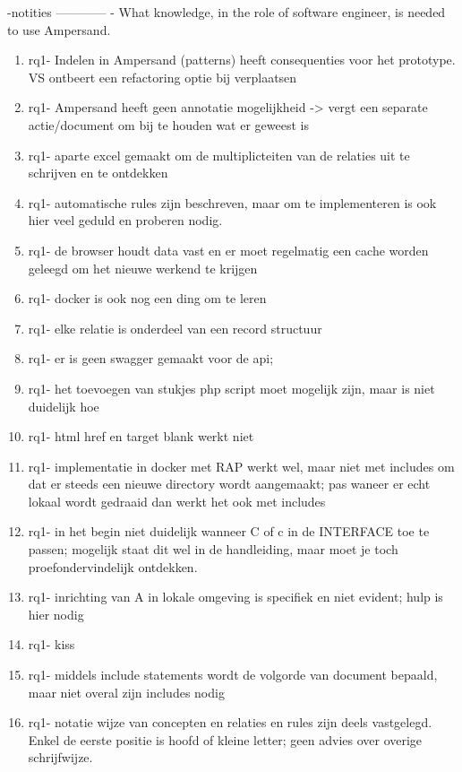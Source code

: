 -notities
\newline
------------
\newline
[RQ1]- What knowledge, in the role of software engineer, is needed to use Ampersand.
\begin{enumerate}
    \item rq1- Indelen in Ampersand (patterns) heeft consequenties voor het prototype. VS ontbeert een refactoring optie bij verplaatsen
    \item rq1- Ampersand heeft geen annotatie mogelijkheid -> vergt een separate actie/document om bij te houden wat er geweest is
    \item rq1- aparte excel gemaakt om de multiplicteiten van de relaties uit te schrijven en te ontdekken
    \item rq1- automatische rules zijn beschreven, maar om te implementeren is ook hier veel geduld en proberen nodig. 
    \item rq1- de browser houdt data vast en er moet regelmatig een cache worden geleegd om het nieuwe werkend te krijgen
    \item rq1- docker is ook nog een ding om te leren
    \item rq1- elke relatie is onderdeel van een record structuur
    \item rq1- er is geen swagger gemaakt voor de api; 
    \item rq1- het toevoegen van stukjes php script moet mogelijk zijn, maar is niet duidelijk hoe
    \item rq1- html href en target blank werkt niet
    \item rq1- implementatie in docker met RAP werkt wel, maar niet met includes om dat er steeds een nieuwe directory wordt aangemaakt; pas waneer er echt lokaal wordt gedraaid dan werkt het ook met includes
    \item rq1- in het begin niet duidelijk wanneer C of c in de INTERFACE toe te passen; mogelijk staat dit wel in de handleiding, maar moet je toch proefondervindelijk ontdekken.
    \item rq1- inrichting van A in lokale omgeving is specifiek en niet evident; hulp is hier nodig
    \item rq1- kiss
    \item rq1- middels include statements wordt de volgorde van document bepaald, maar niet overal zijn includes nodig
    \item rq1- notatie wijze van concepten en relaties en rules zijn deels vastgelegd. Enkel de eerste positie is hoofd of kleine letter; geen advies over overige schrijfwijze.

\end{enumerate}
